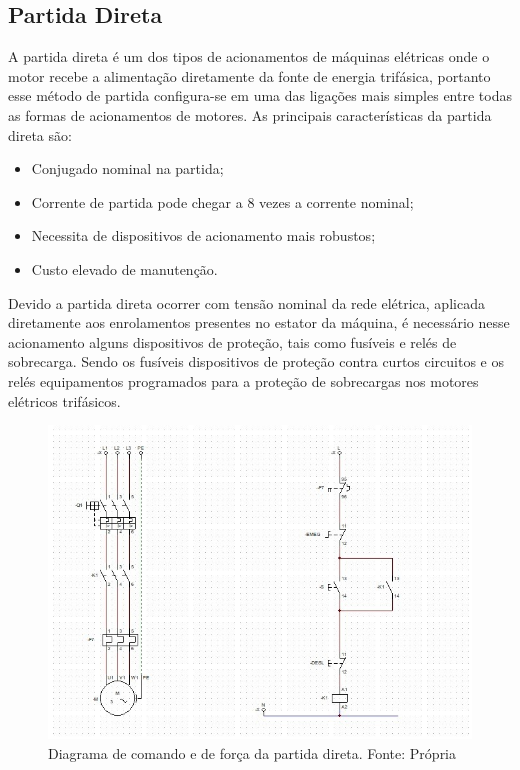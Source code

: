 \documentclass[a4paper, 12pt,oneside, english, brazil]{abntex2}
\begin{document}
\subsection{Partida Direta}
A partida direta é um dos tipos de acionamentos de máquinas elétricas onde o motor recebe a alimentação diretamente da fonte de energia trifásica, portanto esse método de partida configura-se em uma das ligações mais simples entre todas as formas de acionamentos de motores.
As principais características da partida direta são:
\begin{itemize}
    \item Conjugado nominal na partida;
    \item Corrente de partida pode chegar a 8 vezes a corrente nominal;
    \item Necessita de dispositivos de acionamento mais robustos;
    \item Custo elevado de manutenção.

\end{itemize}

Devido a partida direta ocorrer com tensão nominal da rede elétrica, aplicada diretamente aos enrolamentos presentes no estator da máquina, é  necessário nesse acionamento alguns dispositivos de proteção, tais como fusíveis e relés de sobrecarga. Sendo os fusíveis dispositivos de proteção contra curtos circuitos e os relés equipamentos programados para a proteção de sobrecargas nos motores elétricos trifásicos. 

\begin{figure}[H]
    \centering
    \includegraphics[scale=0.9]{partdir.jpg}
    \caption{Diagrama de comando e de força da partida direta. Fonte: Própria}
    \label{partdir}
\end{figure}
\end{document}
